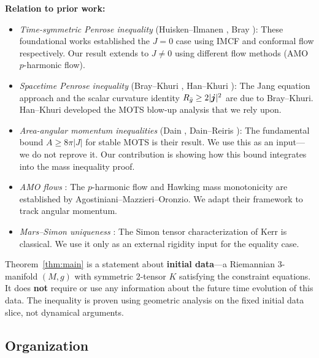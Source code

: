 \textbf{Relation to prior work:}
\begin{itemize}
    \item \textit{Time-symmetric Penrose inequality} (Huisken--Ilmanen \cite{huisken2001}, Bray \cite{bray2001}): These foundational works established the $J=0$ case using IMCF and conformal flow respectively. Our result extends to $J \neq 0$ using different flow methods (AMO $p$-harmonic flow).
    
    \item \textit{Spacetime Penrose inequality} (Bray--Khuri \cite{braykhuri2010}, Han--Khuri \cite{hankhuri2013}): The Jang equation approach and the scalar curvature identity $R_{\bar{g}} \geq 2|\boldsymbol{j}|^2$ are due to Bray--Khuri. Han--Khuri developed the MOTS blow-up analysis that we rely upon.
    
    \item \textit{Area-angular momentum inequalities} (Dain \cite{dain2008}, Dain--Reiris \cite{dain2011}): The fundamental bound $A \geq 8\pi|J|$ for stable MOTS is their result. We use this as an input---we do not reprove it. Our contribution is showing how this bound integrates into the mass inequality proof.
    
    \item \textit{AMO flows} \cite{amo2022}: The $p$-harmonic flow and Hawking mass monotonicity are established by Agostiniani--Mazzieri--Oronzio. We adapt their framework to track angular momentum.
    
    \item \textit{Mars--Simon uniqueness} \cite{mars1999, simon1984}: The Simon tensor characterization of Kerr is classical. We use it only as an external rigidity input for the equality case.
\end{itemize}

\begin{remark}
Theorem~\ref{thm:main} is a statement about \textbf{initial data}---a Riemannian 3-manifold $(M, g)$ with symmetric 2-tensor $K$ satisfying the constraint equations. It does \textbf{not} require or use any information about the future time evolution of this data. The inequality is proven using geometric analysis on the fixed initial data slice, not dynamical arguments.
\end{remark}

\subsection{Organization}

